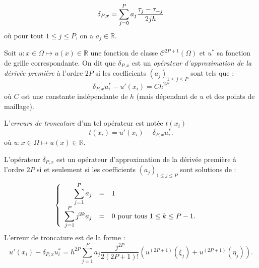 \begin{equation}
\delta_{P,x} = \displaystyle\sum\limits_{j=0}^P a_j \dfrac{\tau_j - \tau_{-j}}{2 j h}
\end{equation}
où  pour tout $1 \leq j \leq P$, on a $a_j \in \mathbb{R}$. 

\begin{definition}
Soit $u :  x \in \Omega \mapsto u(x) \in \mathbb{R}$ une fonction de classe $\mathcal{C}^{2P+1} ( \Omega )$ et $u^*$ sa fonction de grille correspondante. On dit que $\delta_{P,x}$ est un \textit{opérateur d'approximation de la dérivée première} à l'ordre $2P$ si les coefficients $(a_j)_{1 \leq j \leq P}$ sont tels que :
\begin{equation}
\delta_{P,x} u^*_i - u'(x_i) = C h^{2P}
\label{eq:consistance_delta_x_order_2P}
\end{equation}
où $C$ est une constante indépendante de $h$ (mais dépendant de $u$ et des points de maillage). 
\end{definition}

L'\textit{erreurs de troncature} d'un tel opérateur est notée $t(x_i)$ 
\begin{equation}
t(x_i) = u'(x_i) - \delta_{P,x} u^*_i.
\end{equation}
où $u : x \in \Omega \mapsto u(x) \in \mathbb{R}$.

\begin{theoreme}
L'opérateur $\delta_{P,x}$ est un opérateur d'approximation de la dérivée première à l'ordre $2P$ si et seulement si les coefficients $(a_j)_{1 \leq j \leq P}$ sont solutions de :
\begin{equation}
\left\lbrace
\begin{array}{rcll}
\displaystyle\sum\limits_{j=1}^P a_j & = & 1 & \\
\displaystyle\sum\limits_{j=1}^P j^{2k} a_j & = & 0 \text{ pour tous } 1 \leq k \leq P-1.
\end{array}
\right.
\end{equation}
L'erreur de troncature est de la forme :
\begin{equation}
u'(x_i) - \delta_{P,x} u^*_i = h^{2P}\sum_{j=1}^P a_j \dfrac{j^{2P}}{2(2P+1)!} \left( u^{(2P+1)}(\xi_j) + u^{(2P+1)}(\eta_j) \right).
\end{equation}
\label{th:consistance_delta_x_explicite}
\end{theoreme}

